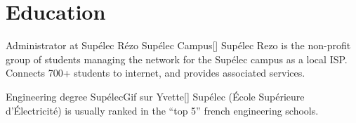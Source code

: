 \documentclass[12pt,a4paper]{moderncv}
\begin{document}





\section{Education}

        {Administrator at Supélec Rézo}
        {Supélec Campus}{}{[]}
{Supélec Rezo is the non-profit group of students managing the network
  for the Supélec campus as a local ISP. Connects 700+ students to internet, and
  provides associated services.}

        {Engineering degree}
        {Supélec}{Gif sur Yvette}{[]}
{Supélec (École Supérieure d'Électricité) is usually
  ranked in the ``top 5'' french engineering schools.}


\end{document}
